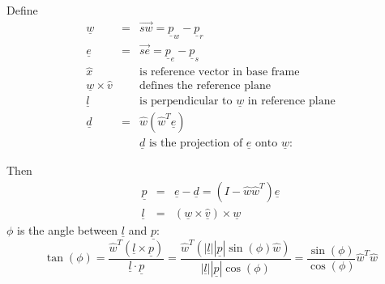 \documentclass[]{article}
\begin{document}
Define 
\begin{eqnarray}
 \underline{w} & = & \overrightarrow{sw} = \underline{p}_{w}-\underline{p}_{r} \nonumber \\
 \underline{e} & = & \overrightarrow{se} = \underline{p}_{e}-\underline{p}_{s} \nonumber \\
 \hat{x} && \text{is reference vector in base frame} \nonumber \\
 \underline{w}\times\hat{v} && \text{defines the reference plane} \nonumber \\
 \underline{l} && \text{is perpendicular to $\underline{w}$ in reference plane} \nonumber \\
 \underline{d} & = & \hat{w}(\hat{w}^{T}\underline{e}) \nonumber\\
 && \text{$\underline{d}$ is the projection of $\underline{e}$ onto $\underline{w}$}: \nonumber
\end{eqnarray}
\begin{figure}[h!]
	\centering
\end{figure}

Then
\begin{eqnarray}
    \underline{p} & = & \underline{e} - \underline{d} = (I-\hat{w}\hat{w}^{T})\underline{e} \nonumber \\
    \underline{l} & = & (\underline{w} \times \hat{\underline{v}}) \times \underline{w} \nonumber
\end{eqnarray}
$\phi$ is the angle between $\underline{l}$ and $\underline{p}$:
\begin{displaymath}
 \tan(\phi) = \frac{\hat{w}^{T}(\underline{l}\times\underline{p})}{\underline{l} \cdot \underline{p}} = \frac{\hat{w}^{T}\left(|\underline{l}||\underline{p}|\sin(\phi)\hat{w}\right)}{|\underline{l}||\underline{p}|\cos(\phi)} = \frac{\sin(\phi)}{\cos(\phi)}\hat{w}^{T}\hat{w} 
\end{displaymath}
\end{document}

